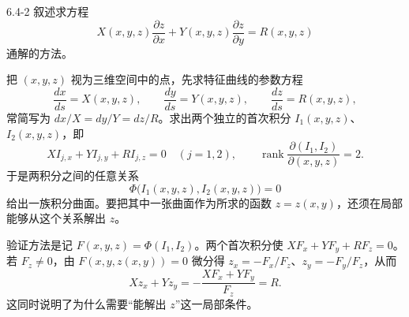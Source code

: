 \documentclass[UTF8,a4paper,11pt]{ctexart}
\begin{document}
\begin{problem}{6.4-2}
叙述求方程
\[
X(x,y,z)\frac{\partial z}{\partial x}
+Y(x,y,z)\frac{\partial z}{\partial y}
=R(x,y,z)
\]
通解的方法。
\end{problem}
\begin{solution}
把 $(x,y,z)$ 视为三维空间中的点，先求特征曲线的参数方程
\[
\frac{dx}{ds}=X(x,y,z),\qquad
\frac{dy}{ds}=Y(x,y,z),\qquad
\frac{dz}{ds}=R(x,y,z),
\]
常简写为 $dx/X=dy/Y=dz/R$。求出两个独立的首次积分
$I_1(x,y,z)$、$I_2(x,y,z)$，即
\[
XI_{j,x}+YI_{j,y}+RI_{j,z}=0
\quad(j=1,2),\qquad
\operatorname{rank}\frac{\partial(I_1,I_2)}{\partial(x,y,z)}=2.
\]
于是两积分之间的任意关系
\[
\boxed{\Phi\bigl(I_1(x,y,z),I_2(x,y,z)\bigr)=0}
\]
给出一族积分曲面。要把其中一张曲面作为所求的函数
$z=z(x,y)$，还须在局部能够从这个关系解出 $z$。

验证方法是记
$F(x,y,z)=\Phi(I_1,I_2)$。两个首次积分使
$XF_x+YF_y+RF_z=0$。若 $F_z\ne0$，由 $F(x,y,z(x,y))=0$ 微分得
$z_x=-F_x/F_z$、$z_y=-F_y/F_z$，从而
\[
Xz_x+Yz_y
=-\frac{XF_x+YF_y}{F_z}=R.
\]
这同时说明了为什么需要“能解出 $z$”这一局部条件。
\end{solution}
\end{document}
